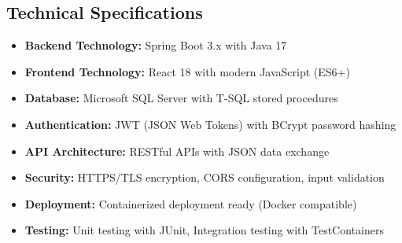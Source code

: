 \documentclass[12pt,a4paper]{article}
\begin{document}
\subsection{Technical Specifications}

\begin{itemize}
    \item \textbf{Backend Technology:} Spring Boot 3.x with Java 17
    \item \textbf{Frontend Technology:} React 18 with modern JavaScript (ES6+)
    \item \textbf{Database:} Microsoft SQL Server with T-SQL stored procedures
    \item \textbf{Authentication:} JWT (JSON Web Tokens) with BCrypt password hashing
    \item \textbf{API Architecture:} RESTful APIs with JSON data exchange
    \item \textbf{Security:} HTTPS/TLS encryption, CORS configuration, input validation
    \item \textbf{Deployment:} Containerized deployment ready (Docker compatible)
    \item \textbf{Testing:} Unit testing with JUnit, Integration testing with TestContainers
\end{itemize}
\end{document}
